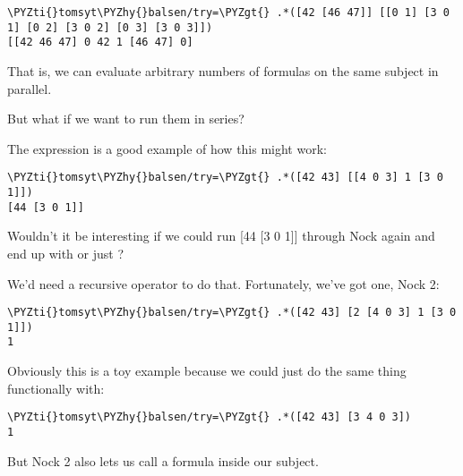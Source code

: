 \begin{framed_shaded}
\begin{Verbatim}[fontsize=\relsize{-2.5},fontseries=b,commandchars=\\\{\}]
\PYZti{}tomsyt\PYZhy{}balsen/try=\PYZgt{} .*([42 [46 47]] [[0 1] [3 0 1] [0 2] [3 0 2] [0 3] [3 0 3]])
[[42 46 47] 0 42 1 [46 47] 0]
\end{Verbatim}
\end{framed_shaded}

That is, we can evaluate arbitrary numbers of formulas on the same subject in
parallel.

But what if we want to run them in series? 

The expression \kode{*[[42 43] [[4 0 3] 1 [0 1]]]} is a good example of how this might work:

\begin{framed_shaded}
\begin{Verbatim}[fontsize=\relsize{-2.5},fontseries=b,commandchars=\\\{\}]
\PYZti{}tomsyt\PYZhy{}balsen/try=\PYZgt{} .*([42 43] [[4 0 3] 1 [3 0 1]])
[44 [3 0 1]]
\end{Verbatim}
\end{framed_shaded}

Wouldn't it be interesting if we could run [44 [3 0 1]] through Nock again and end up with \kode{*[44 [3 0 1]]} or just ?

We'd need a recursive operator to do that. Fortunately, we've got one, Nock 2:

\begin{framed_shaded}
\begin{Verbatim}[fontsize=\relsize{-2.5},fontseries=b,commandchars=\\\{\}]
\PYZti{}tomsyt\PYZhy{}balsen/try=\PYZgt{} .*([42 43] [2 [4 0 3] 1 [3 0 1]])
1
\end{Verbatim}
\end{framed_shaded}
Obviously this is a toy example because we could just do the same thing
functionally with:

\begin{framed_shaded}
\begin{Verbatim}[fontsize=\relsize{-2.5},fontseries=b,commandchars=\\\{\}]
\PYZti{}tomsyt\PYZhy{}balsen/try=\PYZgt{} .*([42 43] [3 4 0 3])
1
\end{Verbatim}
\end{framed_shaded}
But Nock 2 also lets us call a formula inside our subject.

